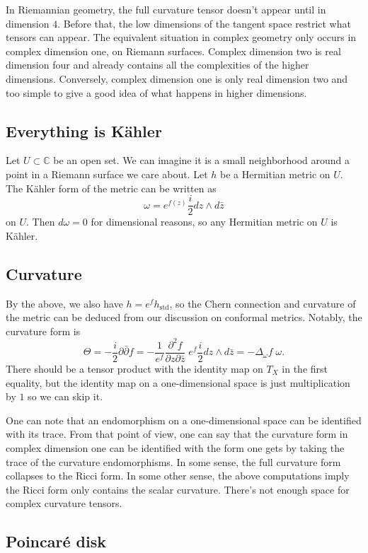 \documentclass[10pt,a4paper]{article}
\newcommand{\kk}[1]{\mathbb{#1}}
\begin{document}
In Riemannian geometry, the full curvature tensor doesn't appear until in dimension $4$. Before that, the low dimensions of the tangent space restrict what tensors can appear. The equivalent situation in complex geometry only occurs in complex dimension one, on Riemann surfaces. Complex dimension two is real dimension four and already contains all the complexities of the higher dimensions. Conversely, complex dimension one is only real dimension two and too simple to give a good idea of what happens in higher dimensions.

\subsection{Everything is K\"ahler}
Let $U \subset \kk C$ be an open set. We can imagine it is a small neighborhood around a point in a Riemann surface we care about. Let $h$ be a Hermitian metric on $U$. The K\"ahler form of the metric can be written as
$$
\omega = e^{f(z)} \frac{i}{2} dz \wedge d\bar z
$$
on $U$. Then $d\omega = 0$ for dimensional reasons, so any Hermitian metric on $U$ is K\"ahler.

\subsection{Curvature}
By the above, we also have $h = e^f h_{\mathrm{std}}$, so the Chern connection and curvature of the metric can be deduced from our discussion on conformal metrics. Notably, the curvature form is
$$
\Theta
= -\frac i2\partial\bar\partial f
= -\frac{1}{e^f}\frac{\partial^2f}{\partial z \partial \bar z} \; e^f \frac{i}{2} dz \wedge d\bar z
= -\Delta_\omega f \; \omega.
$$
There should be a tensor product with the identity map on $T_X$ in the first equality, but the identity map on a one-dimensional space is just multiplication by $1$ so we can skip it.

One can note that an endomorphism on a one-dimensional space can be identified with its trace. From that point of view, one can say that the curvature form in complex dimension one can be identified with the form one gets by taking the trace of the curvature endomorphisms. In some sense, the full curvature form collapses to the Ricci form. In some other sense, the above computations imply the Ricci form only contains the scalar curvature. There's not enough space for complex curvature tensors.


\subsection{Poincar\'e disk}
\end{document}
